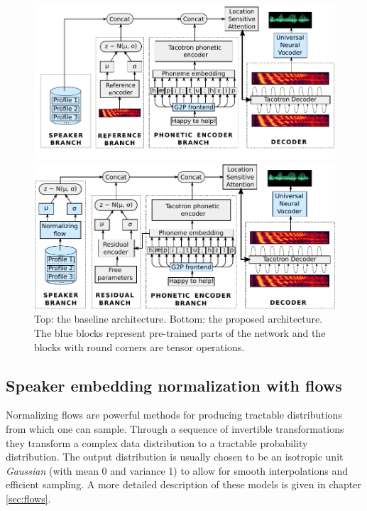 \begin{figure}[h!]
	\centering

	\includegraphics[width=1.0\linewidth]{tts/images/baseline_architecture}

	\vspace{0.5cm}

	\includegraphics[width=1.0\linewidth]{tts/images/proposed_architecture}

	\caption[TTS baseline vs proposed architectures]{Top: the baseline architecture. Bottom: the proposed architecture. The blue blocks represent pre-trained parts of the network and the blocks with round corners are tensor operations.}
	\label{fig:architectures}
\end{figure}


\subsection{Speaker embedding normalization with flows}
Normalizing flows \autocite{rezende2015} are powerful methods for producing tractable distributions from which one can sample. Through a sequence of invertible transformations they transform a complex data distribution to a tractable probability distribution. The output distribution is usually chosen to be an isotropic unit \textit{Gaussian} (with mean 0 and variance 1) to allow for smooth interpolations and efficient sampling. A more detailed description of these models is given in chapter \ref{sec:flows}.

